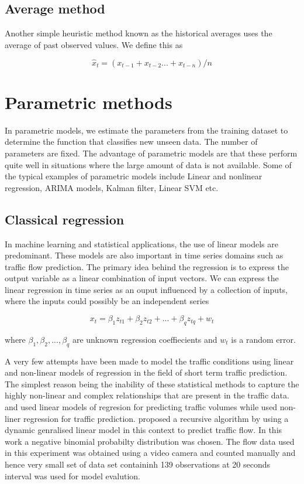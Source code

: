 \subsection{Average method}
Another simple heuristic method known as the historical averages uses the average of past observed
values. We define this as

        \begin{equation}
            \hat{x}_{t} = (x_{t-1} + x_{t-2} ... + x_{t-n})/n
        \end{equation}

\section{Parametric methods}
In parametric models, we estimate the parameters from the training dataset to determine the
function that classifies new unseen data. The number of parameters are fixed. The advantage of
parametric models are that these perform quite well in situations where the large amount of data
is not available. Some of the typical examples of parametric models include Linear and
nonlinear regression, ARIMA models, Kalman filter, Linear SVM etc.

\subsection{Classical regression}
In machine learning and statistical applications, the use of linear models are predominant. These
models are also important in time series domains such as traffic flow prediction. The primary
idea behind the regression is to express the output variable as a linear combination of input
vectors. We can express the linear regression in time series as an ouput influenced by a
collection of inputs, where the inputs could possibly be an independent series

        \begin{equation}
            x_{t} = \beta_{1}z_{t1} + \beta_{2}z_{t2} + ... + \beta_{q}z_{tq} + w_{t}
        \end{equation}

where $ \beta_{1}, \beta_{2},...,\beta_{q} $ are unknown regression coeffiecients and $w_{t}$ is
a random error.

A very few attempts have been made to model the traffic conditions using linear and non-linear
models of regression in the field of short term traffic prediction. The simplest reason being the
inability of these statistical methods to capture the highly non-linear and complex relationships that
are present in the traffic data.
\citet{low1972new} and \citet{jensen1973calibrating} used linear models of regresion for predicting
traffic volumes while \citet{hogberg1976estimation} used non-liner regression for traffic prediction.
\citet{lan1999real} proposed a recursive algorithm by using a dynamic genralised linear model
in this context to predict traffic flow. In this work a negative binomial probabilty distribution
was chosen. The flow data used in this experiment was obtained using a video camera and counted
manually and hence very small set of data set containinh 139 observations at 20 seconds interval
was used for model evalution.

